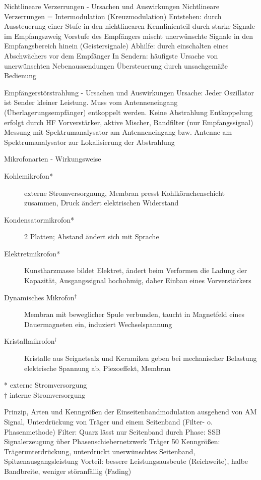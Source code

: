 \documentclass[avery5371,grid,frame,a4paper]{flashcards}
\newcommand{\card}[3]{
  \begin{flashcard}[{\chap} -- #1]{#2}#3\end{flashcard}
}
\begin{document}
\card{42}{Nichtlineare Verzerrungen - Ursachen und Auswirkungen}{
  Nichtlineare Verzerrungen = Intermodulation (Kreuzmodulation)
Entstehen: durch Aussteuerung einer Stufe in den nichtlinearen 
Kennlinienteil durch starke Signale im Empfangszweig Vorstufe
des Empfängers mischt unerwünschte Signale in den 
Empfangsbereich hinein (Geistersignale)
Abhilfe: durch einschalten eines Abschwächers vor dem Empfänger
In Sendern: häufigste Ursache von unerwünschten Nebenaussendungen
Übersteuerung  durch unsachgemäße Bedienung 
}
\card{43}{Empfängerstörstrahlung - Ursachen und Auswirkungen}{
  Ursache: Jeder Oszillator ist Sender kleiner Leistung. Muss vom
Antenneneingang (Überlagerungsempfänger) entkoppelt werden.
Keine Abstrahlung Entkoppelung erfolgt durch HF Vorverstärker, 
aktive Mischer, Bandfilter (nur Empfangssignal)
Messung mit Spektrumanalysator am Antenneneingang bzw. Antenne
am Spektrumanalysator zur Lokalisierung der Abstrahlung
}
\card{44}{Mikrofonarten - Wirkungsweise}{
  \tiny
  \begin{description}
    \item[Kohlemikrofon*]
      externe Stromversorgnung,
      Membran presst Kohlkörnchenschicht zusammen,
      Druck ändert elektrischen Widerstand
    \item[Kondensatormikrofon*]
      2 Platten; Abstand ändert sich mit Sprache
    \item[Elektretmikrofon*]
      Kunstharzmasse bildet Elektret, ändert beim Verformen die Ladung der Kapazität,
      Ausgangssignal hochohmig, daher Einbau eines Vorverstärkers
    \item[Dynamisches Mikrofon$^\dagger$]
      Membran mit beweglicher Spule verbunden,
      taucht in Magnetfeld eines Dauermagneten ein,
      induziert Wechselspannung 
    \item[Kristallmikrofon$^\dagger$]
      Kristalle aus Seignetsalz und Keramiken geben bei mechanischer Belastung elektrische Spannung ab,
      Piezoeffekt, Membran
  \end{description}

  * \quad externe Stromversorgung \\
  $\dagger$ \quad interne Stromversorgung
}
\card{45}{Prinzip, Arten und Kenngrößen der Einseitenbandmodulation}{
  ausgehend von AM Signal, Unterdrückung von 
Träger und einem Seitenband (Filter- o. 
Phasenmethode)
Filter: Quarz lässt nur Seitenband durch
Phase: SSB Signalerzeugung über Phasenschiebernetzwerk
Träger 50%
Kenngrößen: Trägerunterdrückung, unterdrückt
unerwünschtes Seitenband, Spitzenausgangsleistung
Vorteil: bessere Leistungsausbeute (Reichweite),
halbe Bandbreite, weniger störanfällig (Fading)
}
\end{document}
